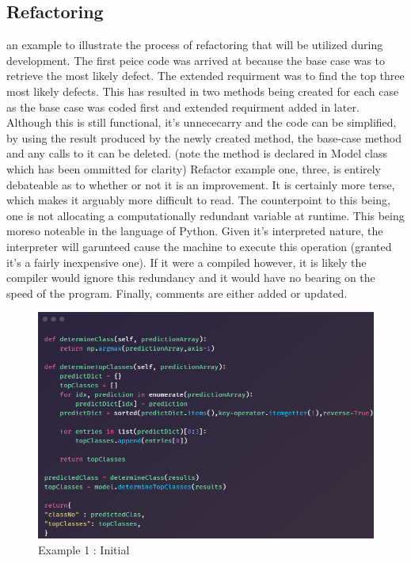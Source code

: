    \subsection{Refactoring}
   an example to illustrate the process of refactoring that will be utilized during development. The first peice code was arrived at because the base case was to retrieve the most likely defect. The extended requirment was to find the top three most likely defects. This has resulted in two methods being created for each case as the base case was coded first and extended requirment added in later. Although this is still functional, it's unnececarry and the code can be simplified, by using the result produced by the newly created method, the base-case method and any calls to it can be deleted. (note the method is declared in Model class which has been ommitted for clarity) Refactor example one, three, is entirely debateable as to whether or not it is an improvement. It is certainly more terse, which makes it arguably more difficult to read. The counterpoint to this being,  one is not allocating a computationally redundant variable at runtime. This being moreso noteable in the language of Python. Given it's interpreted nature, the interpreter will garunteed cause the machine to execute this operation (granted it's a fairly inexpensive one). If it were a compiled however, it is likely the compiler would ignore this redundancy and it would have no bearing on the speed of the program. Finally, comments are either added or updated.

   \begin{figure}[H]
     \begin{center}
       \includegraphics[scale=0.55]{Images/Refactor/refactorA1}
       \caption{Example 1 : Initial}
       \label{fig:refactorA1}
     \end{center}
   \end{figure}

